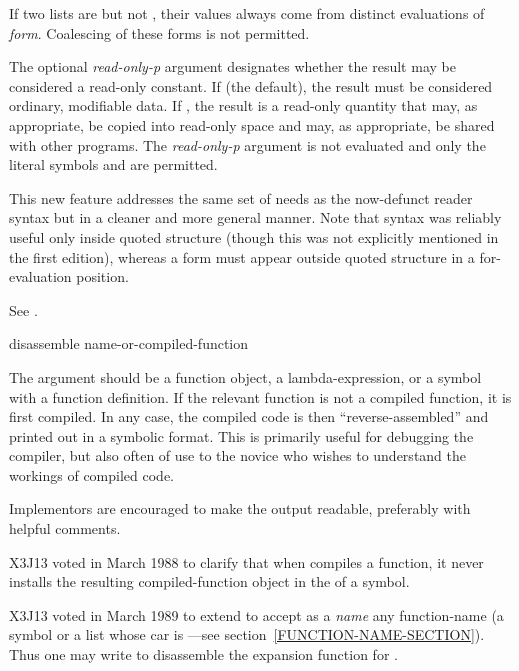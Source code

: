 \begin{newer}
\begin{defspec}
  If two lists  are  but not , their
  values always come from distinct evaluations of \emph{form}.  Coalescing
  of these forms is not permitted.

   The optional \emph{read-only-p} argument designates whether the result
   may be considered a
   read-only constant. If  (the default), the result must be considered
   ordinary, modifiable data. If , the result is a read-only quantity
   that may, as appropriate, be copied into read-only space and may,
   as appropriate, be shared
   with other programs.  The \emph{read-only-p} argument is
   not evaluated and only the literal symbols  and  are permitted.

   This new feature addresses the same set of needs as the now-defunct
   \cd{\#,} reader syntax but in a cleaner and more general manner.
   Note that \cd{\#,} syntax was reliably useful only inside quoted structure
   (though this was not explicitly mentioned in the first edition),
   whereas a  form must appear outside quoted structure in a
   for-evaluation position.

   See .
\end{defspec}
\end{newer}

\begin{defun}[Function]
disassemble name-or-compiled-function

The argument should be a function object, a lambda-expression, or
a symbol with a function definition.  If the relevant function is not a
compiled function, it is first compiled.  In any case, the compiled code
is then ``reverse-assembled'' and printed out in a symbolic format.  This
is primarily useful for debugging the compiler, but also often of use to
the novice who wishes to understand the workings of compiled code.

\beforenoterule
\begin{implementation}
Implementors are encouraged to make the output
readable, preferably with helpful comments.
\end{implementation}
\afternoterule

\begin{newer}
X3J13 voted in March 1988 
to clarify that when  compiles a function, it never
installs the resulting compiled-function object in the
 of a symbol.
\end{newer}

\begin{newer}
X3J13 voted in March 1989  to extend 
to accept as a \emph{name} any function-name (a symbol or a list
whose car is ---see section~\ref{FUNCTION-NAME-SECTION}).
Thus one may write  to disassemble the 
expansion function for .
\end{newer}
\end{defun}

